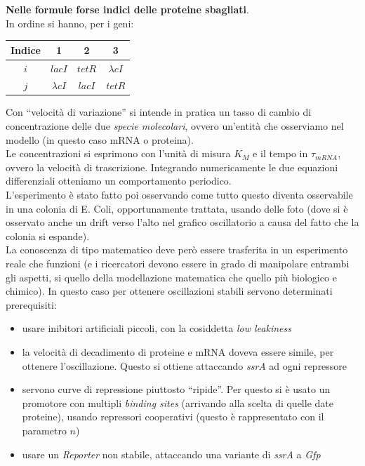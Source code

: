 \documentclass[a4paper,12pt, oneside]{book}
\begin{document}
\textbf{Nelle formule forse indici delle proteine sbagliati}.\\
In ordine si hanno, per i geni:
\begin{table}[H]
  \centering
  \begin{tabular}{c|c|c|c}
    Indice & 1 & 2 & 3\\
    \hline
    \hline
    $i$ & $lacI$ & $ tetR$ & $\lambda cI$\\
    \hline
    $j$ & $\lambda cI$ & $lacI$ & $ tetR$ 
  \end{tabular}
\end{table}
Con ``velocità di variazione'' si intende in pratica un tasso di cambio di
concentrazione delle due \textit{specie molecolari}, ovvero un'entità che
osserviamo nel modello (in questo caso mRNA o proteina). \\
Le concentrazioni si esprimono con l'unità di misura $K_M$ e il tempo in
$\tau_{mRNA}$, ovvero la velocità di trascrizione.
Integrando numericamente le due equazioni differenziali otteniamo un
comportamento periodico.\\
L'esperimento è stato fatto poi osservando come tutto questo diventa osservabile
in una colonia di E. Coli, opportunamente trattata, usando delle foto (dove si è
osservato anche un drift verso l'alto nel grafico oscillatorio a causa del fatto
che la colonia si espande).\\
La conoscenza di tipo matematico deve però essere trasferita in un esperimento
reale che funzioni (e i ricercatori devono essere in grado di manipolare
entrambi gli aspetti, si quello della modellazione matematica che quello più
biologico e chimico). In questo caso per ottenere oscillazioni stabili servono
determinati prerequisiti:
\begin{itemize}
  \item usare inibitori artificiali piccoli, con la cosiddetta \textit{low
    leakiness} 
  \item la velocità di decadimento di proteine e mRNA doveva essere simile, per
  ottenere l'oscillazione. Questo si ottiene attaccando \textit{ssrA} ad ogni
  repressore 
  \item servono curve di repressione piuttosto ``ripide''. Per questo si è
  usato un promotore con multipli \textit{binding sites} (arrivando alla scelta
  di quelle date proteine), usando repressori
  cooperativi (questo è rappresentato con il parametro $n$) 
  \item usare un \textit{Reporter} non stabile, attaccando una variante di
  \textit{ssrA} a \textit{Gfp}
\end{itemize}
\end{document}
